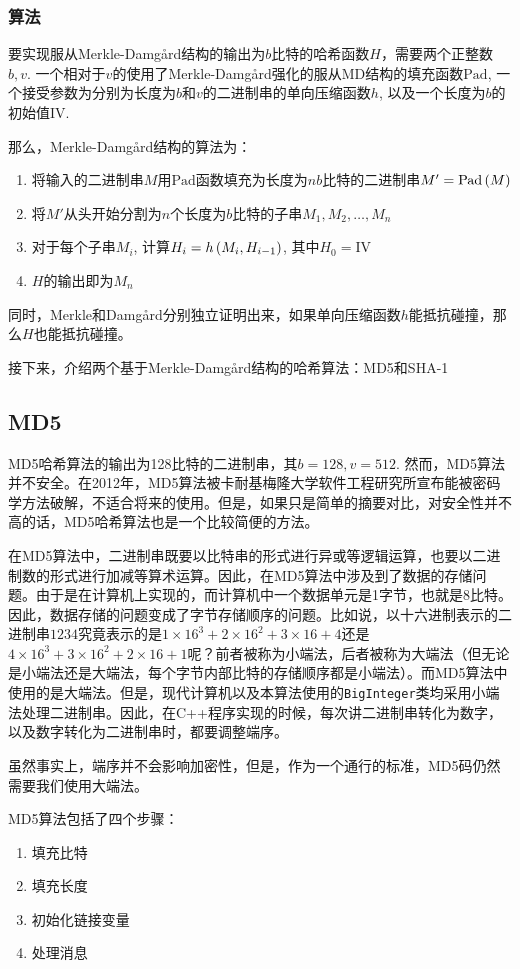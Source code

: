 \subsubsection{算法}
要实现服从Merkle-Damg\aa rd结构的输出为$b$比特的哈希函数$H$，需要两个正整数$b, v$. 一个相对于$v$的使用了Merkle-Damg\aa rd强化的服从MD结构的填充函数$\mathrm{Pad}$, 一个接受参数为分别为长度为$b$和$v$的二进制串的单向压缩函数$h$, 以及一个长度为$b$的初始值$\mathrm{IV}$.\par
那么，Merkle-Damg\aa rd结构的算法为：
\begin{enumerate}
	\item 将输入的二进制串$M$用$\mathrm{Pad}$函数填充为长度为$nb$比特的二进制串$M'=\mathrm{Pad}\left( {M}\right)$
	\item 将$M'$从头开始分割为$n$个长度为$b$比特的子串$M_1, M_2, \ldots, M_n$
	\item 对于每个子串$M_i$, 计算$H_i=h\left( {M_i, H_{i-1}}\right)$, 其中$H_0=\mathrm{IV}$
	\item $H$的输出即为$M_n$
\end{enumerate}

同时，Merkle和Damg\aa rd分别独立证明出来，如果单向压缩函数$h$能抵抗碰撞，那么$H$也能抵抗碰撞。\par
接下来，介绍两个基于Merkle-Damg\aa rd结构的哈希算法：MD5和SHA-1
\subsection{MD5}
MD5哈希算法的输出为128比特的二进制串，其$b=128, v=512$. 然而，MD5算法并不安全。在2012年，MD5算法被卡耐基梅隆大学软件工程研究所宣布能被密码学方法破解，不适合将来的使用。但是，如果只是简单的摘要对比，对安全性并不高的话，MD5哈希算法也是一个比较简便的方法。\par
在MD5算法中，二进制串既要以比特串的形式进行异或等逻辑运算，也要以二进制数的形式进行加减等算术运算。因此，在MD5算法中涉及到了数据的存储问题。由于是在计算机上实现的，而计算机中一个数据单元是1字节，也就是8比特。因此，数据存储的问题变成了字节存储顺序的问题。比如说，以十六进制表示的二进制串$1234$究竟表示的是$1\times 16^3+2\times 16^2+3\times 16+4$还是$4\times 16^3+3\times 16^2+2\times 16+1$呢？前者被称为小端法，后者被称为大端法（但无论是小端法还是大端法，每个字节内部比特的存储顺序都是小端法）。而MD5算法中使用的是大端法。但是，现代计算机以及本算法使用的\verb`BigInteger`类均采用小端法处理二进制串。因此，在C++程序实现的时候，每次讲二进制串转化为数字，以及数字转化为二进制串时，都要调整端序。\par
虽然事实上，端序并不会影响加密性，但是，作为一个通行的标准，MD5码仍然需要我们使用大端法。\par
MD5算法包括了四个步骤：
\begin{enumerate}
	\item 填充比特
	\item 填充长度
	\item 初始化链接变量
	\item 处理消息
\end{enumerate}

